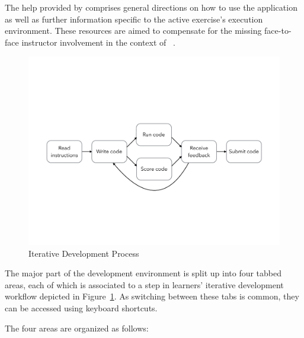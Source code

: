 The help provided by \tool comprises general directions on how to use the application as well as further information specific to the active exercise's execution environment. These resources are aimed to compensate for the missing face-to-face instructor involvement in the context of \moocs~\cite{pieterse2013automated}.

\begin{figure}
\centering
\includegraphics[clip=true, trim=2.5cm 7.7cm 2.5cm 9.6cm, width=\textwidth]{images/development-process}
\caption{Iterative Development Process}
\label{figure:development-process}
\end{figure}

The major part of the development environment is split up into four tabbed areas, each of which is associated to a step in learners' iterative development workflow depicted in Figure~\ref{figure:development-process}. As switching between these tabs is common, they can be accessed using keyboard shortcuts.

\newpage

The four areas are organized as follows:


